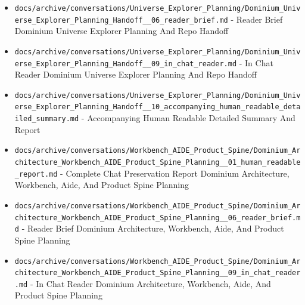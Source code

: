 \documentclass[10.5pt,a4paper,openany]{book}
\begin{document}
\begin{itemize}
\item \texttt{docs/\allowbreak{}archive/\allowbreak{}conversations/\allowbreak{}Universe\_\allowbreak{}Explorer\_\allowbreak{}Planning/\allowbreak{}Dominium\_\allowbreak{}Universe\_\allowbreak{}Explorer\_\allowbreak{}Planning\_\allowbreak{}Handoff\_\allowbreak{}\_\allowbreak{}06\_\allowbreak{}reader\_\allowbreak{}brief.\allowbreak{}md} -\allowbreak{} Reader Brief Dominium Universe Explorer Planning And Repo Handoff
\item \texttt{docs/\allowbreak{}archive/\allowbreak{}conversations/\allowbreak{}Universe\_\allowbreak{}Explorer\_\allowbreak{}Planning/\allowbreak{}Dominium\_\allowbreak{}Universe\_\allowbreak{}Explorer\_\allowbreak{}Planning\_\allowbreak{}Handoff\_\allowbreak{}\_\allowbreak{}09\_\allowbreak{}in\_\allowbreak{}chat\_\allowbreak{}reader.\allowbreak{}md} -\allowbreak{} In Chat Reader Dominium Universe Explorer Planning And Repo Handoff
\item \texttt{docs/\allowbreak{}archive/\allowbreak{}conversations/\allowbreak{}Universe\_\allowbreak{}Explorer\_\allowbreak{}Planning/\allowbreak{}Dominium\_\allowbreak{}Universe\_\allowbreak{}Explorer\_\allowbreak{}Planning\_\allowbreak{}Handoff\_\allowbreak{}\_\allowbreak{}10\_\allowbreak{}accompanying\_\allowbreak{}human\_\allowbreak{}readable\_\allowbreak{}detailed\_\allowbreak{}summary.\allowbreak{}md} -\allowbreak{} Accompanying Human Readable Detailed Summary And Report
\item \texttt{docs/\allowbreak{}archive/\allowbreak{}conversations/\allowbreak{}Workbench\_\allowbreak{}AIDE\_\allowbreak{}Product\_\allowbreak{}Spine/\allowbreak{}Dominium\_\allowbreak{}Architecture\_\allowbreak{}Workbench\_\allowbreak{}AIDE\_\allowbreak{}Product\_\allowbreak{}Spine\_\allowbreak{}Planning\_\allowbreak{}\_\allowbreak{}01\_\allowbreak{}human\_\allowbreak{}readable\_\allowbreak{}report.\allowbreak{}md} -\allowbreak{} Complete Chat Preservation Report Dominium Architecture, Workbench, Aide, And Product Spine Planning
\item \texttt{docs/\allowbreak{}archive/\allowbreak{}conversations/\allowbreak{}Workbench\_\allowbreak{}AIDE\_\allowbreak{}Product\_\allowbreak{}Spine/\allowbreak{}Dominium\_\allowbreak{}Architecture\_\allowbreak{}Workbench\_\allowbreak{}AIDE\_\allowbreak{}Product\_\allowbreak{}Spine\_\allowbreak{}Planning\_\allowbreak{}\_\allowbreak{}06\_\allowbreak{}reader\_\allowbreak{}brief.\allowbreak{}md} -\allowbreak{} Reader Brief Dominium Architecture, Workbench, Aide, And Product Spine Planning
\item \texttt{docs/\allowbreak{}archive/\allowbreak{}conversations/\allowbreak{}Workbench\_\allowbreak{}AIDE\_\allowbreak{}Product\_\allowbreak{}Spine/\allowbreak{}Dominium\_\allowbreak{}Architecture\_\allowbreak{}Workbench\_\allowbreak{}AIDE\_\allowbreak{}Product\_\allowbreak{}Spine\_\allowbreak{}Planning\_\allowbreak{}\_\allowbreak{}09\_\allowbreak{}in\_\allowbreak{}chat\_\allowbreak{}reader.\allowbreak{}md} -\allowbreak{} In Chat Reader Dominium Architecture, Workbench, Aide, And Product Spine Planning

\end{itemize}
\end{document}
